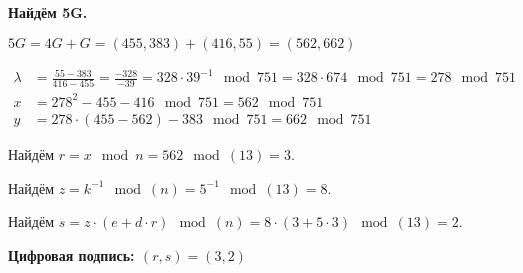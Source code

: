 \textbf{Найдём 5G.}


$5G = 4G + G = (455, 383) + (416, 55) = (562, 662)$

\begin{equation*}
	\begin{aligned}
		\lambda &= \frac{55-383}{416-455} = \frac{-328}{-39} = 328 \cdot 39^{-1}\mod{751} = 328 \cdot 674\mod{751} = 278\mod{751} \\
		x &= 278^2 - 455 - 416 \mod{751} = 562\mod{751} \\
		y &= 278 \cdot (455 - 562) - 383\mod{751} = 662\mod{751}
	\end{aligned}
\end{equation*}

Найдём $r = x \mod{n} = 562 \mod(13) = 3$.

Найдём $z = k^{-1} \mod(n) = 5^{-1} \mod(13) = 8$.

Найдём $s = z \cdot (e+ d \cdot r)\mod(n) = 8 \cdot (3+ 5 \cdot 3)\mod(13)=2$.

\textbf{Цифровая подпись: $(r,s)=(3, 2)$}